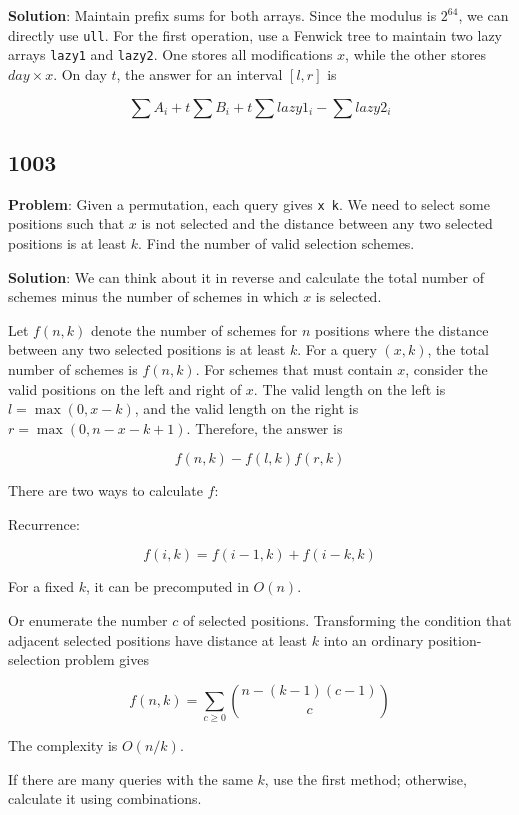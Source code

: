 \documentclass[
  a4paper,
  10pt]{article}
\begin{document}
\textbf{Solution}: Maintain prefix sums for both arrays. Since the
modulus is \(2^{64}\), we can directly use \texttt{ull}. For the first
operation, use a Fenwick tree to maintain two lazy arrays \texttt{lazy1}
and \texttt{lazy2}. One stores all modifications \(x\), while the other
stores \(day \times x\). On day \(t\), the answer for an interval
\([l,r]\) is

\[
\sum A_i+t\sum B_i+t\sum lazy1_i-\sum lazy2_i
\]

\subsection*{1003}\label{section-2}

\textbf{Problem}: Given a permutation, each query gives \texttt{x\ k}.
We need to select some positions such that \(x\) is not selected and the
distance between any two selected positions is at least \(k\). Find the
number of valid selection schemes.

\textbf{Solution}: We can think about it in reverse and calculate the
total number of schemes minus the number of schemes in which \(x\) is
selected.

Let \(f(n,k)\) denote the number of schemes for \(n\) positions where
the distance between any two selected positions is at least \(k\). For a
query \((x,k)\), the total number of schemes is \(f(n,k)\). For schemes
that must contain \(x\), consider the valid positions on the left and
right of \(x\). The valid length on the left is \(l=\max(0,x-k)\), and
the valid length on the right is \(r=\max(0,n-x-k+1)\). Therefore, the
answer is

\[
f(n,k)-f(l,k)f(r,k)
\]

There are two ways to calculate \(f\):

Recurrence:

\[
f(i,k)=f(i-1,k)+f(i-k,k)
\]

For a fixed \(k\), it can be precomputed in \(O(n)\).

Or enumerate the number \(c\) of selected positions. Transforming the
condition that adjacent selected positions have distance at least \(k\)
into an ordinary position-selection problem gives

\[
f(n,k)=\sum_{c\ge 0}\binom{n-(k-1)(c-1)}{c}
\]

The complexity is \(O(n/k)\).

If there are many queries with the same \(k\), use the first method;
otherwise, calculate it using combinations.
\end{document}

